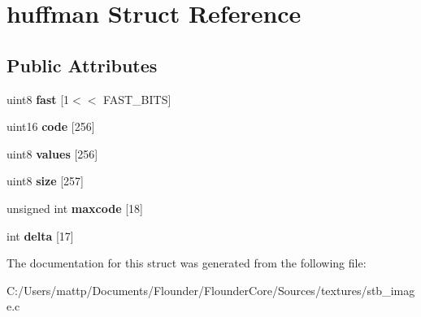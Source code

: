 \hypertarget{structhuffman}{}\section{huffman Struct Reference}
\label{structhuffman}
\subsection*{Public Attributes}
\begin{DoxyCompactItemize}
\item 
\mbox{\label{structhuffman_a9dbb29a8ed724a32f502d9595510ddc2}} 
uint8 {\bfseries fast} \mbox{[}1$<$$<$ F\+A\+S\+T\+\_\+\+B\+I\+TS\mbox{]}
\item 
\mbox{\label{structhuffman_a9925018a95d5a2122cd732561fa0fa64}} 
uint16 {\bfseries code} \mbox{[}256\mbox{]}
\item 
\mbox{\label{structhuffman_a313d78cf23f40b314c25681ff2a6224b}} 
uint8 {\bfseries values} \mbox{[}256\mbox{]}
\item 
\mbox{\label{structhuffman_afdb0fbcf25aec42ba30b0d0e2453a057}} 
uint8 {\bfseries size} \mbox{[}257\mbox{]}
\item 
\mbox{\label{structhuffman_aeb78aca6c7377faaad8123566d54fc98}} 
unsigned int {\bfseries maxcode} \mbox{[}18\mbox{]}
\item 
\mbox{\label{structhuffman_a04255e3e1c6de74d36a08a1aa4e9537d}} 
int {\bfseries delta} \mbox{[}17\mbox{]}
\end{DoxyCompactItemize}


The documentation for this struct was generated from the following file\+:\begin{DoxyCompactItemize}
\item 
C\+:/\+Users/mattp/\+Documents/\+Flounder/\+Flounder\+Core/\+Sources/textures/stb\+\_\+image.\+c\end{DoxyCompactItemize}
